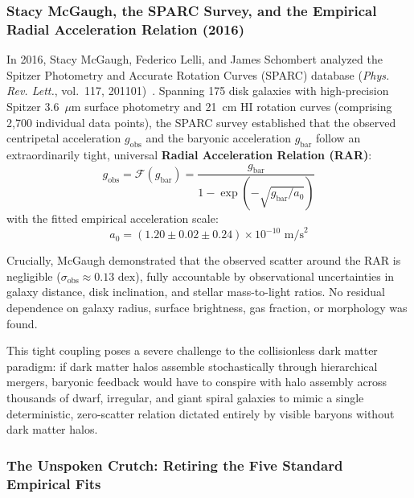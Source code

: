 \documentclass[11pt,a4paper]{article}
\begin{document}
\subsubsection{Stacy McGaugh, the SPARC Survey, and the Empirical Radial Acceleration Relation (2016)}
\label{subsubsec:mcgaugh_2016}

In 2016, Stacy McGaugh, Federico Lelli, and James Schombert analyzed the Spitzer Photometry and Accurate Rotation Curves (SPARC) database (\textit{Phys. Rev. Lett.}, vol.~117, 201101)~\cite{McGaugh2016}. Spanning 175 disk galaxies with high-precision Spitzer 3.6~$\mu\text{m}$ surface photometry and 21~cm HI rotation curves (comprising 2,700 individual data points), the SPARC survey established that the observed centripetal acceleration $g_{\text{obs}}$ and the baryonic acceleration $g_{\text{bar}}$ follow an extraordinarily tight, universal \textbf{Radial Acceleration Relation (RAR)}:
\begin{equation}
g_{\text{obs}} = \mathcal{F}(g_{\text{bar}}) = \frac{g_{\text{bar}}}{1 - \exp\left(-\sqrt{g_{\text{bar}} / a_0}\right)}
\label{eq:mcgaugh_rar_formula}
\end{equation}
with the fitted empirical acceleration scale:
\begin{equation}
a_0 = (1.20 \pm 0.02 \pm 0.24) \times 10^{-10}\text{ m/s}^2
\label{eq:mcgaugh_a0_fitted}
\end{equation}

Crucially, McGaugh demonstrated that the observed scatter around the RAR is negligible ($\sigma_{\text{obs}} \approx 0.13\text{ dex}$), fully accountable by observational uncertainties in galaxy distance, disk inclination, and stellar mass-to-light ratios. No residual dependence on galaxy radius, surface brightness, gas fraction, or morphology was found. 

This tight coupling poses a severe challenge to the collisionless dark matter paradigm: if dark matter halos assemble stochastically through hierarchical mergers, baryonic feedback would have to conspire with halo assembly across thousands of dwarf, irregular, and giant spiral galaxies to mimic a single deterministic, zero-scatter relation dictated entirely by visible baryons without dark matter halos.

\subsubsection{The Unspoken Crutch: Retiring the Five Standard Empirical Fits}
\label{subsubsec:five_standard_fits}
\end{document}
